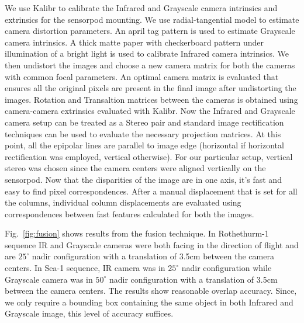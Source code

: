 \documentclass[runningheads]{llncs}
\begin{document}
We use Kalibr \cite{furgale2013unified} to calibrate the Infrared and Grayscale camera intrinsics and extrinsics for the sensorpod mounting. We use radial-tangential model to estimate camera distortion parameters. An april tag pattern is used to estimate Grayscale camera intrinsics. A thick matte paper with checkerboard pattern under illumination of a bright light is used to calibrate Infrared camera intrinsics. We then undistort the images and choose a new camera matrix for both the cameras with common focal parameters. An optimal camera matrix is evaluated that ensures all the original pixels are present in the final image after undistorting the images. Rotation and Transaltion matrices between the cameras is obtained using camera-camera extrinsics evaluated with Kalibr. Now the Infrared and Grayscale camera setup can be treated as a Stereo pair and standard image rectification techniques can be used to evaluate the necessary projection matrices. At this point, all the epipolar lines are parallel to image edge (horizontal if horizontal rectification was employed, vertical otherwise). For our particular setup, vertical stereo was chosen since the camera centers were aligned vertically on the sensorpod. Now that the disparities of the image are in one axis, it's fast and easy to find pixel correspondences. After a manual displacement that is set for all the columns, individual column displacements are evaluated using correspondences between fast features calculated for both the images.


Fig.~\ref{fig:fusion} shows results from the fusion technique. In Rothethurm-1 sequence IR and Grayscale cameras were both facing in the direction of flight and are $25^{\circ}$ nadir configuration with a translation of 3.5cm between the camera centers. In Sea-1 sequence, IR camera was in $25^{\circ}$ nadir configuration while Grayscale camera was in $50^{\circ}$ nadir configuration with a translation of 3.5cm between the camera centers. The results show reasonable overlap accuracy. Since, we only require a bounding box containing the same object in both Infrared and Grayscale image, this level of accuracy suffices.
\end{document}
